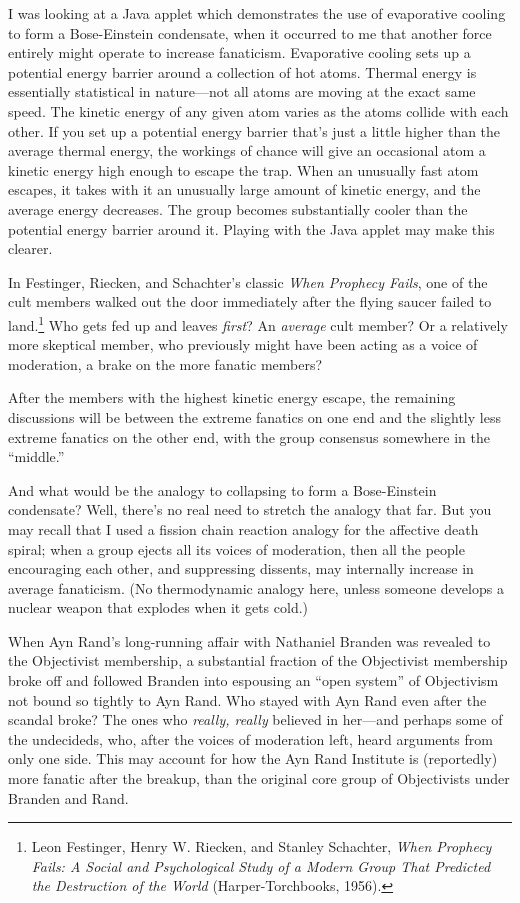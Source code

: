 {
 I was looking at a Java applet which demonstrates the use of
evaporative cooling to form a Bose-Einstein condensate, when it
occurred to me that another force entirely might operate to increase
fanaticism. Evaporative cooling sets up a potential energy barrier
around a collection of hot atoms. Thermal energy is essentially
statistical in nature---not all atoms are moving at the exact same
speed. The kinetic energy of any given atom varies as the atoms collide
with each other. If you set up a potential energy barrier
that's just a little higher than the average thermal
energy, the workings of chance will give an occasional atom a kinetic
energy high enough to escape the trap. When an unusually fast atom
escapes, it takes with it an unusually large amount of kinetic energy,
and the average energy decreases. The group becomes substantially
cooler than the potential energy barrier around it. Playing with the
Java applet may make this clearer.}

{
 In Festinger, Riecken, and Schachter's classic
\textit{When Prophecy Fails}, one of the cult members walked out the
door immediately after the flying saucer failed to
land.\footnote{Leon Festinger, Henry W. Riecken, and Stanley Schachter,
\textit{When Prophecy Fails: A Social and Psychological Study of a
Modern Group That Predicted the Destruction of the World}
(Harper-Torchbooks, 1956).} Who gets fed up and leaves \textit{first}? An
\textit{average} cult member? Or a relatively more skeptical member,
who previously might have been acting as a voice of moderation, a brake
on the more fanatic members?}

{
 After the members with the highest kinetic energy escape, the
remaining discussions will be between the extreme fanatics on one end
and the slightly less extreme fanatics on the other end, with the group
consensus somewhere in the
``middle.''}

{
 And what would be the analogy to collapsing to form a
Bose-Einstein condensate? Well, there's no real need to
stretch the analogy that far. But you may recall that I used a fission
chain reaction analogy for the affective death spiral; when a group
ejects all its voices of moderation, then all the people encouraging
each other, and suppressing dissents, may internally increase in
average fanaticism. (No thermodynamic analogy here, unless someone
develops a nuclear weapon that explodes when it gets cold.)}

{
 When Ayn Rand's long-running affair with Nathaniel
Branden was revealed to the Objectivist membership, a substantial
fraction of the Objectivist membership broke off and followed Branden
into espousing an ``open system'' of
Objectivism not bound so tightly to Ayn Rand. Who stayed with Ayn Rand
even after the scandal broke? The ones who \textit{really, really}
believed in her---and perhaps some of the undecideds, who, after the
voices of moderation left, heard arguments from only one side. This may
account for how the Ayn Rand Institute is (reportedly) more fanatic
after the breakup, than the original core group of Objectivists under
Branden and Rand.}

